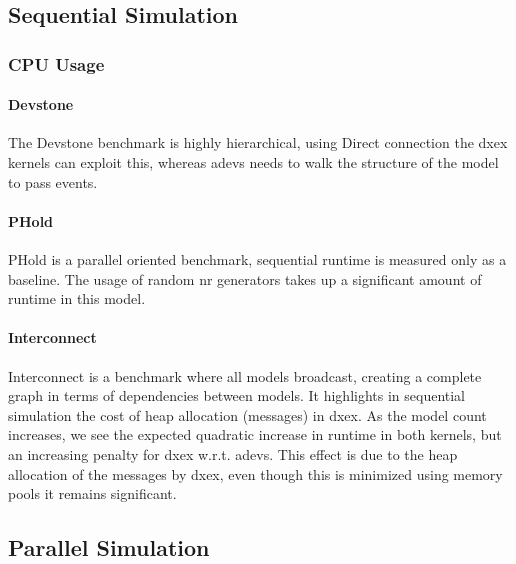\subsection{Sequential Simulation}
\subsubsection{CPU Usage}
\paragraph*{Devstone}
The Devstone \cite{DEVStone} benchmark is highly hierarchical, using Direct connection the dxex kernels can exploit this, whereas adevs needs to walk the structure of the model to pass events.
\paragraph*{PHold}
PHold \cite{PHOLD} is a parallel oriented benchmark, sequential runtime is measured only as a baseline. The usage of random nr generators takes up a significant amount of runtime in this model.
\paragraph*{Interconnect}
Interconnect \cite{van2013research} is a benchmark where all models broadcast, creating a complete graph in terms of dependencies between models. It highlights in sequential simulation the cost of heap allocation (messages) in dxex. As the model count increases, we see the expected quadratic increase in runtime in both kernels, but an increasing penalty for dxex w.r.t. adevs. This effect is due to the heap allocation of the messages by dxex, even though this is minimized using memory pools it remains significant.

\subsection{Parallel Simulation}
